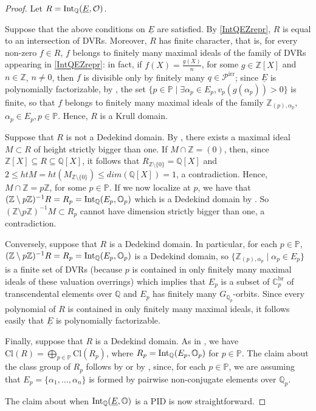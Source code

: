 \documentclass[10pt]{article}
\numberwithin{equation}{section}
\theoremstyle{definition}\newtheorem{Def}[equation]{Definition}
\theoremstyle{definition}\newtheorem{Ques}[equation]{Question}
\newcommand{\Q}{\mathbb{Q}}
\newcommand{\Z}{\mathbb{Z}}
\renewcommand{\O}{\mathbb{O}}
\newcommand{\C}{\mathbb{C}}
\newcommand{\PP}{\mathbb{P}}
\newcommand{\Int}{\textnormal{Int}}
\newcommand{\IntQ}{\Int_{\Q}}
\newcommand{\uE}{\underline{E}}
\newcommand{\Cl}{\text{Cl}}
\begin{document}
\begin{proof}
Let $R=\IntQ(\uE,\mathcal{O})$.

Suppose that the above conditions on $\uE$ are satisfied. By \eqref{IntQEZrepr}, $R$ is equal to an intersection of DVRs. Moreover, $R$ has finite character, that is, for every non-zero $f\in R$, $f$ belongs to finitely many maximal ideals of the family of DVRs appearing in  \eqref{IntQEZrepr}: in fact, if $f(X)=\frac{g(X)}{n}$, for some $g\in\Z[X]$ and $n\in\Z$, $n\not=0$, then $f$ is divisible only by finitely many $q\in\mathcal{P}^{\text{irr}}$; since $\uE$ is polynomially factorizable, by \cite[Lemma 2.12]{PerDedekind}, the set $\{p\in\PP\mid \exists\alpha_p\in E_p, v_p(g(\alpha_p))>0\}$ is finite, so that $f$ belongs to finitely many maximal ideals of the family $\Z_{(p),\alpha_p}$, $\alpha_p\in E_p,p\in\PP$. Hence, $R$ is a Krull domain.

Suppose that $R$ is not a Dedekind domain. By \cite[Proposition 2.2]{Heitmann}, there exists a maximal ideal $M\subset R$ of height strictly bigger than one. If $M\cap\Z=(0)$, then, since $\Z[X] \subseteq R \subseteq \Q[X]$, it follows that $R_{\Z\setminus \{0\}} = \Q[X]$ and $2 \leq htM = ht(M_{\Z \setminus \{0\}}) \leq dim(\Q[X])=1$, a contradiction.
Hence, $M\cap \Z=p\Z$, for some $p\in\PP$. If we now localize at $p$, we have that $(\Z\setminus p\Z)^{-1}R=R_p=\IntQ(E_p,\O_p)$ which is a Dedekind domain by \cite[Theorem]{EakHei}. So $(\Z\setminus p\Z)^{-1}M\subset R_p$ cannot have dimension strictly bigger than one, a contradiction.

Conversely, suppose that $R$ is a Dedekind domain.  In  particular, for each $p\in\PP$, $(\Z\setminus p\Z)^{-1}R=R_p=\IntQ(E_p,\O_p)$ is a Dedekind domain, so $\{\Z_{(p),\alpha_p}\mid \alpha_p\in E_p\}$ is a finite set of DVRs (because $p$ is contained in only finitely many maximal ideals of these valuation overrings) which implies that $E_p$ is a subset of $\C_p^{\text{br}}$ of transcendental elements over $\Q$ and $E_p$ has finitely many $G_{\Q_p}$-orbits. Since every polynomial of $R$ is contained in only finitely many maximal ideals, it follows easily that $\uE$ is polynomially factorizable.


Finally, suppose that $R$ is a Dedekind domain. As in \cite[Lemma 2.14]{PerDedekind}, we have $\Cl(R)=\bigoplus_{p\in\PP}\Cl(R_p)$, where $R_p=\IntQ(E_p,\O_p)$ for $p\in\PP$. The  claim about the class group of $R_p$ follows by \cite[Proposition 2.10]{PerDedekind} or by \cite[Theorem]{EakHei}, since, for each $p\in\PP$, we are assuming that $E_p=\{\alpha_1,\ldots,\alpha_n\}$ is formed by pairwise non-conjugate elements over $\Q_p$. 

The claim about when $\IntQ(\uE,\O)$ is a PID is now straightforward.
\end{proof}
\end{document}
